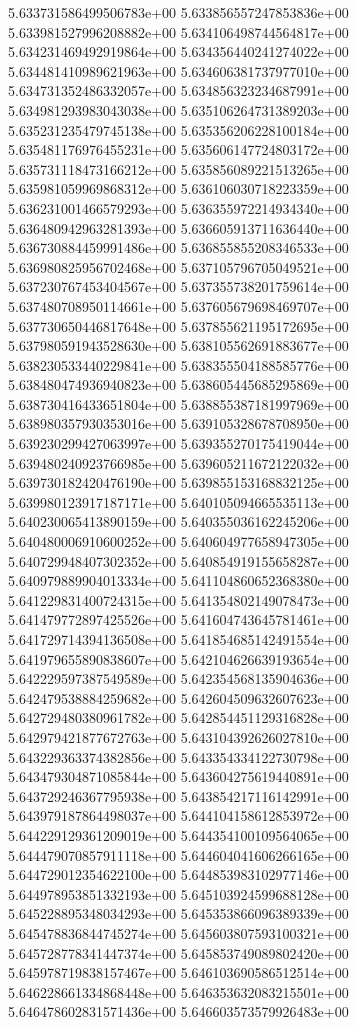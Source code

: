 5.633731586499506783e+00
5.633856557247853836e+00
5.633981527996208882e+00
5.634106498744564817e+00
5.634231469492919864e+00
5.634356440241274022e+00
5.634481410989621963e+00
5.634606381737977010e+00
5.634731352486332057e+00
5.634856323234687991e+00
5.634981293983043038e+00
5.635106264731389203e+00
5.635231235479745138e+00
5.635356206228100184e+00
5.635481176976455231e+00
5.635606147724803172e+00
5.635731118473166212e+00
5.635856089221513265e+00
5.635981059969868312e+00
5.636106030718223359e+00
5.636231001466579293e+00
5.636355972214934340e+00
5.636480942963281393e+00
5.636605913711636440e+00
5.636730884459991486e+00
5.636855855208346533e+00
5.636980825956702468e+00
5.637105796705049521e+00
5.637230767453404567e+00
5.637355738201759614e+00
5.637480708950114661e+00
5.637605679698469707e+00
5.637730650446817648e+00
5.637855621195172695e+00
5.637980591943528630e+00
5.638105562691883677e+00
5.638230533440229841e+00
5.638355504188585776e+00
5.638480474936940823e+00
5.638605445685295869e+00
5.638730416433651804e+00
5.638855387181997969e+00
5.638980357930353016e+00
5.639105328678708950e+00
5.639230299427063997e+00
5.639355270175419044e+00
5.639480240923766985e+00
5.639605211672122032e+00
5.639730182420476190e+00
5.639855153168832125e+00
5.639980123917187171e+00
5.640105094665535113e+00
5.640230065413890159e+00
5.640355036162245206e+00
5.640480006910600252e+00
5.640604977658947305e+00
5.640729948407302352e+00
5.640854919155658287e+00
5.640979889904013334e+00
5.641104860652368380e+00
5.641229831400724315e+00
5.641354802149078473e+00
5.641479772897425526e+00
5.641604743645781461e+00
5.641729714394136508e+00
5.641854685142491554e+00
5.641979655890838607e+00
5.642104626639193654e+00
5.642229597387549589e+00
5.642354568135904636e+00
5.642479538884259682e+00
5.642604509632607623e+00
5.642729480380961782e+00
5.642854451129316828e+00
5.642979421877672763e+00
5.643104392626027810e+00
5.643229363374382856e+00
5.643354334122730798e+00
5.643479304871085844e+00
5.643604275619440891e+00
5.643729246367795938e+00
5.643854217116142991e+00
5.643979187864498037e+00
5.644104158612853972e+00
5.644229129361209019e+00
5.644354100109564065e+00
5.644479070857911118e+00
5.644604041606266165e+00
5.644729012354622100e+00
5.644853983102977146e+00
5.644978953851332193e+00
5.645103924599688128e+00
5.645228895348034293e+00
5.645353866096389339e+00
5.645478836844745274e+00
5.645603807593100321e+00
5.645728778341447374e+00
5.645853749089802420e+00
5.645978719838157467e+00
5.646103690586512514e+00
5.646228661334868448e+00
5.646353632083215501e+00
5.646478602831571436e+00
5.646603573579926483e+00
